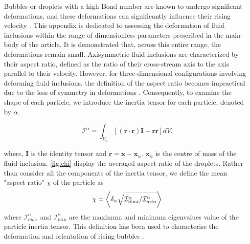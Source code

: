\documentclass[12pt]{My_preprint}
\begin{document}



Bubbles or droplets with a high Bond number are known to undergo significant deformations, and these deformations can significantly influence their rising velocity \citep{bunner2003effect,tripathi2014}. This appendix is dedicated to assessing the deformation of fluid inclusions within the range of dimensionless parameters prescribed in the main-body of the article. It is demonstrated that, across this entire range, the deformations remain small. Axisymmetric fluid inclusions are characterized by their aspect ratio, defined as the ratio of their cross-stream axis to the axis parallel to their velocity. However, for three-dimensional configurations involving deforming fluid inclusions, the definition of the aspect ratio becomes impractical due to the loss of symmetry in deformations \citep{bunner2003effect}. Consequently, to examine the shape of each particle, we introduce the inertia tensor for each particle, denoted by $\alpha$.




\begin{equation*}
    \mathcal{I}^\alpha
    = \int_{V_\alpha} \left[
        (\textbf{r}\cdot \textbf{r}) \textbf{I}  - \textbf{rr}
        \right]
    dV.
\end{equation*}

where, \textbf{I} is the identity tensor and $\textbf{r} = \textbf{x} - \textbf{x}_\alpha$. $\textbf{x}_\alpha$ is the centre of mass of the fluid inclusion. \ref{fig:chi} display the averaged aspect ratio of the droplets. Rather than consider all the components of the inertia tensor, we define the mean "aspect ratio" $\chi$ of the particle as 
\begin{equation}
    \chi = \left<\delta_\alpha \sqrt{\mathcal{I}_{max}^\alpha /\mathcal{I}_{min}^\alpha} \right>
\end{equation} 
where $\mathcal{I}_{max}^\alpha$ and $\mathcal{I}_{min}^\alpha$ are the maximum and minimum eigenvalues value of the particle inertia tensor. This definition has been used to characterise the deformation and orientation of rising bubbles \citep{bunner2003effect}. 
\end{document}
